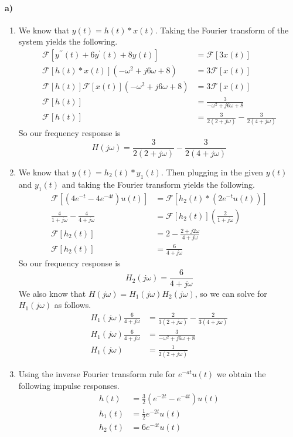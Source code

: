\documentclass[12pt]{article}
\begin{document}
\paragraph{a)}

\begin{enumerate}
    \item We know that \(y(t)=h(t)*x(t)\). Taking the Fourier transform of the system yields the following.
    \begin{align*}
        \mathcal{F}[y^{\prime\prime}(t)+6y^\prime(t)+8y(t)]&=\mathcal{F}[3x(t)]\\
        \mathcal{F}[h(t)*x(t)](-\omega^2+j6\omega+8)&=3\mathcal{F}[x(t)]\\
        \mathcal{F}[h(t)]\mathcal{F}[x(t)](-\omega^2+j6\omega+8)&=3\mathcal{F}[x(t)]\\
        \mathcal{F}[h(t)]&=\frac{3}{-\omega^2+j6\omega+8}\\
        \mathcal{F}[h(t)]&=\frac{3}{2(2+j\omega)}-\frac{3}{2(4+j\omega)}
    \end{align*}
    So our frequency response is
    \[H(j\omega)=\frac{3}{2(2+j\omega)}-\frac{3}{2(4+j\omega)}\]
    \item We know that \(y(t)=h_2(t)*y_1(t)\). Then plugging in the given \(y(t)\) and \(y_1(t)\) and taking the Fourier transform yields the following.
    \begin{align*}
        \mathcal{F}[(4e^{-t}-4e^{-4t})u(t)]&=\mathcal{F}[h_2(t)*(2e^{-t}u(t))]\\
        \frac{4}{1+j\omega}-\frac{4}{4+j\omega}&=\mathcal{F}[h_2(t)]\left(\frac{2}{1+j\omega}\right)\\
        \mathcal{F}[h_2(t)]&=2-\frac{2+j2\omega}{4+j\omega}\\
        \mathcal{F}[h_2(t)]&=\frac{6}{4+j\omega}
    \end{align*}
    So our frequency response is
    \[H_2(j\omega)=\frac{6}{4+j\omega}\]
    We also know that \(H(j\omega)=H_1(j\omega)H_2(j\omega)\), so we can solve for \(H_1(j\omega)\) as follows.
    \begin{align*}
        H_1(j\omega)\frac{6}{4+j\omega}&=\frac{2}{3(2+j\omega)}-\frac{2}{3(4+j\omega)}\\
        H_1(j\omega)\frac{6}{4+j\omega}&=\frac{3}{-\omega^2+j6\omega+8}\\
        H_1(j\omega)&=\frac{1}{2(2+j\omega)}
    \end{align*}
    \item Using the inverse Fourier transform rule for \(e^{-at}u(t)\) we obtain the following impulse responses.
    \begin{align*}
        h(t)&=\frac{3}{2}(e^{-2t}-e^{-4t})u(t)\\
        h_1(t)&=\frac{1}{2}e^{-2t}u(t)\\
        h_2(t)&=6e^{-4t}u(t)
    \end{align*}
\end{enumerate}
\end{document}
